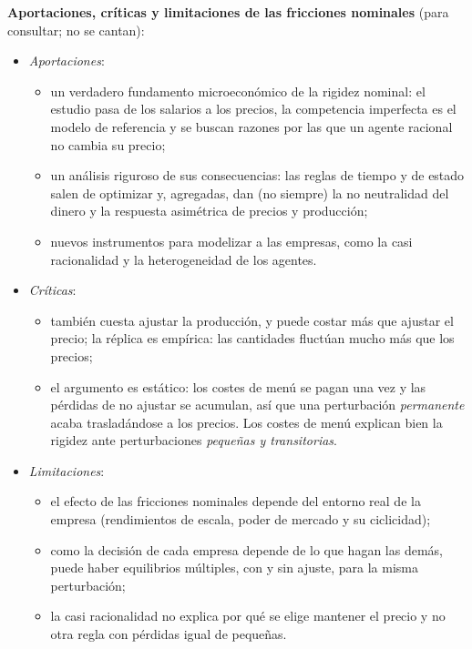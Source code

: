 \documentclass[11pt]{article}
\begin{document}
\begin{anotaciones}
\textbf{Aportaciones, críticas y limitaciones de las fricciones nominales} (para consultar; no se cantan):
\begin{itemize}
\item \emph{Aportaciones}:
  \begin{itemize}
  \item un verdadero fundamento microeconómico de la rigidez nominal: el estudio pasa de los salarios a los precios, la competencia imperfecta es el modelo de referencia y se buscan razones por las que un agente racional no cambia su precio;
  \item un análisis riguroso de sus consecuencias: las reglas de tiempo y de estado salen de optimizar y, agregadas, dan (no siempre) la no neutralidad del dinero y la respuesta asimétrica de precios y producción;
  \item nuevos instrumentos para modelizar a las empresas, como la casi racionalidad y la heterogeneidad de los agentes.
  \end{itemize}
\item \emph{Críticas}:
  \begin{itemize}
  \item también cuesta ajustar la producción, y puede costar más que ajustar el precio; la réplica es empírica: las cantidades fluctúan mucho más que los precios;
  \item el argumento es estático: los costes de menú se pagan una vez y las pérdidas de no ajustar se acumulan, así que una perturbación \emph{permanente} acaba trasladándose a los precios. Los costes de menú explican bien la rigidez ante perturbaciones \emph{pequeñas y transitorias}.
  \end{itemize}
\item \emph{Limitaciones}:
  \begin{itemize}
  \item el efecto de las fricciones nominales depende del entorno real de la empresa (rendimientos de escala, poder de mercado y su ciclicidad);
  \item como la decisión de cada empresa depende de lo que hagan las demás, puede haber equilibrios múltiples, con y sin ajuste, para la misma perturbación\nocite{BallRomer1990Real};
  \item la casi racionalidad no explica por qué se elige mantener el precio y no otra regla con pérdidas igual de pequeñas\nocite{Romer1993New}.
  \end{itemize}
\end{itemize}
\end{anotaciones}
\end{document}
